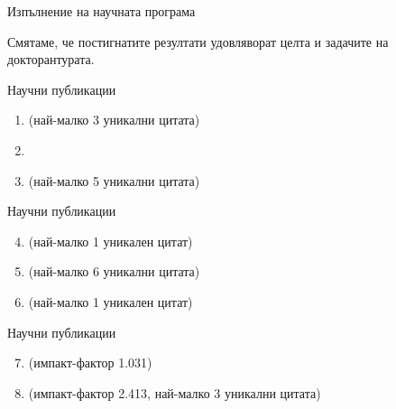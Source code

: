 \documentclass[bulgarian]{beamer}
\begin{document}
\begin{frame}{Изпълнение на научната програма}

\alert{Смятаме, че постигнатите резултати удовляворат целта и задачите на докторантурата.} 

\end{frame}


\begin{frame}{Научни публикации}

\begingroup
{}
\setcounter{count}{99}
%

\begin{enumerate}
\item {} \alert{(най-малко 3 уникални цитата)}
\item {}
\item {} \alert{(най-малко 5 уникални цитата)}

\end{enumerate}

\endgroup

\end{frame}



\begin{frame}{Научни публикации}

\begingroup
{}
\setcounter{count}{99}
%

\begin{enumerate}
\setcounter{enumi}{3}
\item {} \alert{(най-малко 1 уникален цитат)}
\item {} \alert{(най-малко 6 уникални цитата)}
\item {} \alert{(най-малко 1 уникален цитат)}

\end{enumerate}

\endgroup

\end{frame}

\begin{frame}{Научни публикации}

\begingroup
{}
\setcounter{count}{99}
%

\begin{enumerate}
\setcounter{enumi}{6}

\item {} \alert{(импакт-фактор 1.031)}
\item {} \alert{(импакт-фактор 2.413, най-малко 3 уникални цитата)}
\end{enumerate}

\endgroup

\end{frame}
\end{document}
